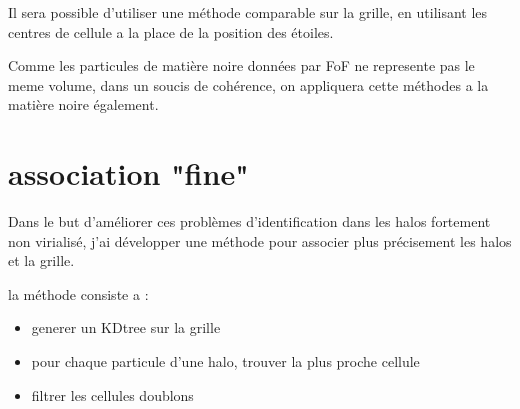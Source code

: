 Il sera possible d'utiliser une méthode comparable sur la grille, en utilisant les centres de cellule a la place de la position des étoiles.

Comme les particules de matière noire  données par FoF ne represente pas le meme volume, dans un soucis de cohérence, on appliquera cette méthodes a la matière noire également.


\section{association "fine"}
Dans le but d'améliorer ces problèmes d'identification dans les halos fortement non virialisé, j'ai développer une méthode pour associer plus précisement les halos et la grille.


la méthode consiste a :
\begin{itemize}
\item generer un KDtree sur la grille
\item pour chaque particule d'une halo, trouver la plus proche cellule
\item filtrer les cellules doublons
\end{itemize}